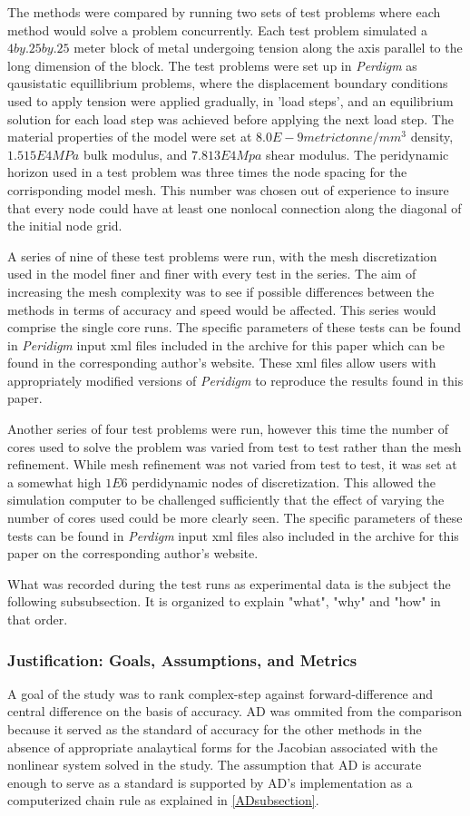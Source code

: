 \documentclass[preprint,12pt]{elsarticle}
\begin{document}
The methods were compared by running two sets of test problems where each method would solve a
problem concurrently. Each test problem simulated a $4 by .25 by .25$ meter block of metal
undergoing tension along the axis parallel to the long dimension of the block. The test problems
were set up in \emph{Perdigm} as qausistatic equillibrium problems, where the displacement boundary
conditions used to apply tension were applied gradually, in 'load steps', and an equilibrium
solution for each load step was achieved before applying the next load step. The material properties
of the model were set at $8.0E-9 metric tonne/ mm^3$ density, $1.515E4 MPa$ bulk modulus, and
$7.813E4 Mpa$ shear modulus. The peridynamic horizon used in a test problem was three times the node
spacing for the corrisponding model mesh. This number was chosen out of experience to insure that
every node could have at least one nonlocal connection along the diagonal of the initial node grid.

A series of nine of these test problems were run, with the mesh discretization used in the model
finer and finer with every test in the series. The aim of increasing the mesh complexity was to see
if possible differences between the methods in terms of accuracy and speed would be affected. This
series would comprise the single core runs. The specific parameters of these tests can be found in
\emph{Peridigm} input xml files included in the archive for this paper which can be found in the
corresponding author's website. These xml files allow users with appropriately modified versions of
\emph{Peridigm} to reproduce the results found in this paper.

Another series of four test problems were run, however this time the number of cores used to solve
the problem was varied from test to test rather than the mesh refinement. While mesh refinement was
not varied from test to test, it was set at a somewhat high $1E6$ perdidynamic nodes of
discretization. This allowed the simulation computer to be challenged sufficiently that the effect
of varying the number of cores used could be more clearly seen. The specific parameters of these
tests can be found in \emph{Perdigm} input xml files also included in the archive for this paper on
the corresponding author's website.

What was recorded during the test runs as experimental data is the subject the following
subsubsection. It is organized to explain "what", "why" and "how" in that order.

\subsubsection{Justification: Goals, Assumptions, and Metrics} 
\label{JGAM}
A goal of the study was to rank complex-step against forward-difference and central difference on
the basis of accuracy. AD was ommited from the comparison because it served as the standard of
accuracy for the other methods in the absence of appropriate analaytical forms for the Jacobian
associated with the nonlinear system solved in the study. The assumption that AD is accurate
enough to serve as a standard is supported by AD's implementation as a computerized chain rule as
explained in \ref{ADsubsection}.
\end{document}
